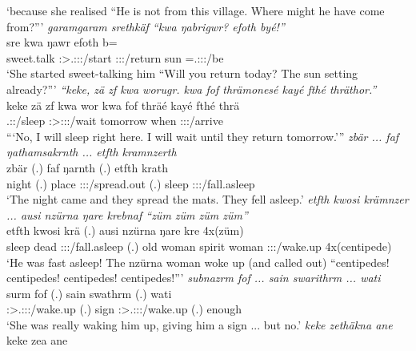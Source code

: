\begin{exe}
	\trans `because she realised ``He is not from this village. Where might he have come from?'''
	\emph{garamgaram srethkäf ``kwa ŋabrigwr? efoth byé!''}\\
	 sre kwa ŋawr efoth b=\\
	{sweet.talk} \Stsg:\Sbj>\Tsg.\Masc:\Obj:\Irr:\Pfv/start \Fut{} \Stsg:\Sbj:\Nonpast:\Ipfv/return sun \Med=\Tsg.\Masc:\Sbj:\Nonpast:\Ipfv/be\\
	\trans `She started sweet-talking him ``Will you return today? The sun setting already?'''
	\emph{``keke, zä zf kwa worugr. kwa fof thrämonesé kayé fthé thräthor.''}\\
	\gll keke zä zf kwa wor kwa fof thräé kayé fthé thrä\\
	\Neg{} \Prox{} \Imm{} \Fut{} \Fsg.\Sbj:\Nonpast:\Ipfv/sleep \Fut{} \Emph{} \Fsg:\Sbj>\Stpl:\Obj:\Irr:\Pfv/wait tomorrow when \Stpl:\Sbj:\Irr:\Pfv/arrive\\
	\trans ```No, I will sleep right here. I will wait until they return tomorrow.'''
	\emph{zbär ... faf ŋathamsakrnth ... etfth kramnzerth}\\
	\gll zbär (.) faf ŋarnth (.) etfth krath\\
	night (.) place \Stdu:\Sbj:\Nonpast:\Ipfv/spread.out (.) sleep \Stdu:\Sbj:\Irr:\Pfv/fall.asleep\\
	\trans `The night came and they spread the mats. They fell asleep.'
	\emph{etfth kwosi krämnzer ... ausi nzürna ŋare krebnaf ``züm züm züm züm''}\\
	\gll etfth kwosi krä (.) ausi nzürna ŋare kre 4x(züm)\\
	sleep dead \Stsg:\Sbj:\Irr:\Pfv/fall.asleep (.) {old woman} spirit woman \Stsg:\Sbj:\Irr:\Pfv/wake.up 4x(centipede)\\
	\trans `He was fast asleep! The nzürna woman woke up (and called out) ``centipedes! centipedes! centipedes! centipedes!'''
	\emph{subnazrm fof ... sain swarithrm ... wati}\\
	\gll surm fof (.) sain swathrm (.) wati\\
	\Sg:\Sbj>\Tsg.\Masc:\Obj:\Pst:\Dur/wake.up \Emph{} (.) sign \Sg:\Sbj>\Tsg.\Masc:\Io:\Pst:\Dur/wake.up (.) enough\\
	\trans `She was really waking him up, giving him a sign ... but no.'
	\emph{keke zethäkna ane}\\
	\gll keke zea ane\\

\end{exe}
